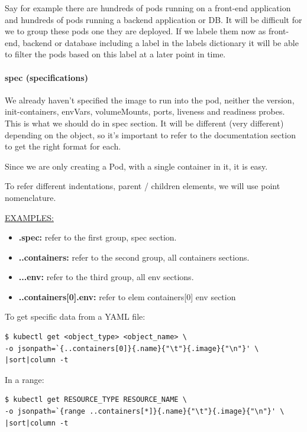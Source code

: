 \documentclass{article}
\newenvironment{blocktemplateI}[1]{%
    \tcolorbox[beamer,%
    noparskip,breakable,
    colframe=Violet,%
    colbacklower=Black,%
    title=#1]}%
    {\endtcolorbox}
\newenvironment{codetemplate}[1][]{%
  \mybasecolorbox[#1]
  \itshape
}{%
  \endmybasecolorbox
}
\begin{document}
Say for example there are hundreds of pods running on a front-end application and hundreds of pods running a backend application or DB. It will be difficult for we to group these pods one they are deployed. If we labele them now as front-end, backend or database including a label in the labels dictionary it will be able to filter the pods based on this label at a later point in time.

\paragraph{spec (specifications)}

We already haven't specified the image to run into the pod, neither the version, init-containers, envVars, volumeMounts, ports, liveness and readiness probes. This is what we should do in spec section. It will be different (very different) depending on the object, so it's important to refer to the documentation section to get the right format for each.

Since we are only creating a Pod, with a single container in it, it is easy. 

\begin{blocktemplateI}{NOTE}
To refer different indentations, parent / children elements, we will use point nomenclature. 


\underline{EXAMPLES:}

\begin{itemize}
    \item \textbf{.spec:} refer to the first group, spec section.
    \item \textbf{..containers:} refer to the second group, all containers sections.
    \item \textbf{...env:} refer to the third group, all env sections.
    \item \textbf{..containers[0].env:} refer to elem containers[0] env section
\end{itemize}

To get specific data from a YAML file:

\begin{codetemplate}{}
\begin{verbatim}
$ kubectl get <object_type> <object_name> \
-o jsonpath=`{..containers[0]}{.name}{"\t"}{.image}{"\n"}' \
|sort|column -t
\end{verbatim}
\end{codetemplate}

In a range:

\begin{codetemplate}{}
\begin{verbatim}
$ kubectl get RESOURCE_TYPE RESOURCE_NAME \
-o jsonpath=`{range ..containers[*]}{.name}{"\t"}{.image}{"\n"}' \
|sort|column -t
\end{verbatim}
\end{codetemplate}

\end{blocktemplateI}
\end{document}
